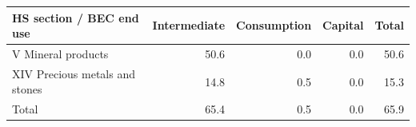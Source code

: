 \begin{tabular}{lrrrr}
\toprule
HS section / BEC end use & Intermediate & Consumption & Capital & Total \\
\midrule
V Mineral products & 50.6 & 0.0 & 0.0 & 50.6 \\
XIV Precious metals and stones & 14.8 & 0.5 & 0.0 & 15.3 \\
\midrule
Total & 65.4 & 0.5 & 0.0 & 65.9 \\
\bottomrule
\end{tabular}
